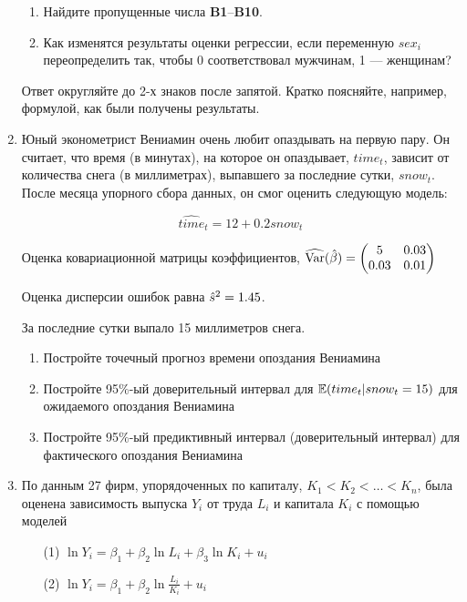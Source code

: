 \documentclass[12pt, a4paper]{article}\usepackage[]{graphicx}\usepackage[]{color}
\begin{document}
\begin{enumerate}
\begin{enumerate}
\item Найдите пропущенные числа \textbf{B1}--\textbf{B10}.

\item Как изменятся результаты оценки регрессии, если переменную $sex_i$ переопределить так, чтобы 0 соответствовал мужчинам, 1 — женщинам?
\end{enumerate}

Ответ округляйте до 2-х знаков после запятой. Кратко поясняйте, например, формулой, как были получены результаты.



\item Юный эконометрист Вениамин очень любит опаздывать на первую пару. Он считает, что время (в минутах), на которое он опаздывает, $time_t$, зависит от количества снега (в миллиметрах), выпавшего за последние сутки, $snow_t$. После месяца упорного сбора данных, он смог оценить следующую модель:

\[
\widehat{time}_t=12+0.2snow_t
\]

Оценка ковариационной матрицы коэффициентов,
$\widehat{\operatorname{Var}}(\hat{\beta}) = \begin{pmatrix}
5 & 0.03 \\
0.03 & 0.01\\
\end{pmatrix}$

Оценка дисперсии ошибок равна $\hat{s}^2=1.45$.

За последние сутки выпало 15 миллиметров снега.

\begin{enumerate}
\item Постройте точечный прогноз времени опоздания Вениамина
\item Постройте 95\%-ый доверительный интервал для $\mathbb{E}(time_t |snow_t=15)$ для ожидаемого опоздания Вениамина
\item	Постройте 95\%-ый предиктивный интервал (доверительный интервал) для фактического опоздания Вениамина
\end{enumerate}


\item По данным 27 фирм, упорядоченных по капиталу, $K_1 < K_2 < \ldots < K_n$, была оценена зависимость выпуска $Y_i$ от труда $L_i$ и капитала $K_i$ с помощью моделей

\begin{enumerate}
\item[(1)] $\ln Y_i = \beta_1 + \beta_2 \ln L_i + \beta_3 \ln K_i + u_i$
\item[(2)] $\ln Y_i = \beta_1 + \beta_2 \ln \frac{L_i}{K_i} + u_i$
\end{enumerate}



\end{enumerate}
\end{document}
